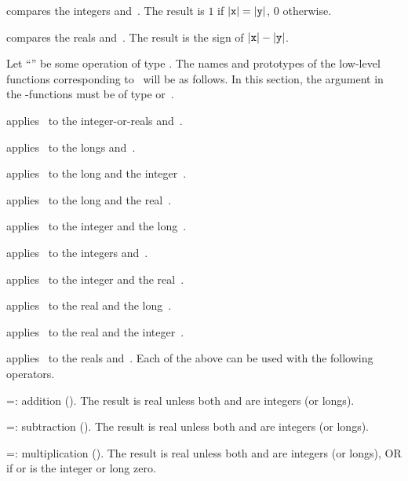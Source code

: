  compares the integers  and~.
The result is $1$ if $|{\tt x}| = |{\tt y}|$, $0$ otherwise.

 compares the reals  and~.
The result is the sign of $|{\tt x}| - |{\tt y}|$.


\noindent
Let ``\op'' be some operation of type . The names and
prototypes of the low-level functions corresponding to \op\ will be as follows.
In this section, the  argument in the -functions must be of type
 or~.

 applies \op\ to
the integer-or-reals  and~.

 applies \op\ to the longs
 and~.

 applies \op\ to the long 
and the integer~.

 applies \op\ to the long 
and the real~.

 applies \op\ to the
integer  and the long~.

 applies \op\ to the
integers  and~.

 applies \op\ to the
integer  and the real~.

 applies \op\ to the real 
and the long~.

 applies \op\ to the real 
and the integer~.

 applies \op\ to the reals 
and~.
\smallskip
\noindent Each of the above can be used with the following operators.

\op=: addition (). The result is real unless both 
and  are integers (or longs).

\op=: subtraction (). The result is real unless both
 and  are integers (or longs).

\op=: multiplication (). The result is real unless both
 and  are integers (or longs), OR if  or  is the
integer or long zero.

